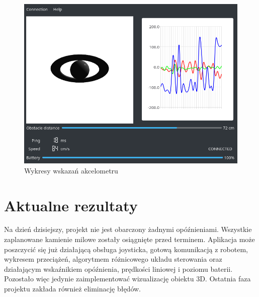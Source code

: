 \documentclass[12pt,a4paper,polish]{article}
\begin{document}
  \begin{figure}[ht]
    \centering
    \includegraphics[width=1\textwidth]{img/app.png}
    \caption{Wykresy wskazań akcelometru}
    \label{fig:wykresy}
  \end{figure}

  
  \section{Aktualne rezultaty}
  Na dzień dzisiejszy, projekt nie jest obarczony żadnymi opóźnieniami. Wszystkie 
  zaplanowane kamienie milowe zostały osiągnięte przed terminem. Aplikacja może 
  poszczycić się już działającą obsługa joysticka, gotową komunikacją z robotem,
  wykresem przeciążeń, algorytmem różnicowego układu sterowania oraz działającym
  wskaźnikiem opóźnienia, prędkości liniowej i poziomu baterii. 
  Pozostało więc jedynie zaimplementować wizualizację obiektu 3D. 
  Ostatnia faza projektu zakłada również eliminację błędów.

  


\end{document}
